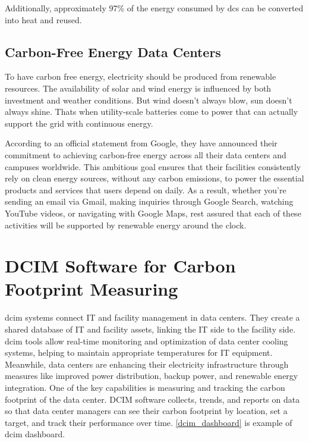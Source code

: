 \documentclass[
  a4paper,  %
  twoside,  %
  bibliography=totoc,
  headsepline,
  cleardoublepage=empty,
  parskip=half,
  draft=false
]{scrbook}
\begin{document}
Additionally, approximately 97\% of the energy consumed by \gls{dc}s can be converted into heat and reused\cite{distributed_head}.

\section{Carbon-Free Energy Data Centers}

To have carbon free energy, electricity should be produced from renewable resources\cite{qazi2019towards}. The availability of solar and wind energy is influenced by both investment and weather conditions. But wind doesn't always blow, sun doesn't always shine. Thats when utility-scale batteries come to power that can actually support the grid with continuous energy.

According to an official statement from Google, they have announced their commitment to achieving carbon-free energy across all their data centers and campuses worldwide. This ambitious goal ensures that their facilities consistently rely on clean energy sources, without any carbon emissions, to power the essential products and services that users depend on daily. As a result, whether you're sending an email via Gmail, making inquiries through Google Search, watching YouTube videos, or navigating with Google Maps, rest assured that each of these activities will be supported by renewable energy around the clock\cite{google2020thirddecade}.


\chapter{DCIM Software for Carbon Footprint Measuring}\label{chap8}
\gls{dcim} systems connect IT and facility management in data centers. They create a shared database of IT and facility assets, linking the IT side to the facility side\cite{salimenergy}. \gls{dcim} tools allow real-time monitoring and optimization of data center cooling systems, helping to maintain appropriate temperatures for IT equipment. Meanwhile, data centers are enhancing their electricity infrastructure through measures like improved power distribution, backup power, and renewable energy integration\cite{murino2023sustainable}. One of the key capabilities is measuring and tracking the carbon footprint of the data center. DCIM software collects, trends, and reports on data so that data center managers can see their carbon footprint by location, set a target, and track their performance over time\cite{sunbirddcimDataCenter}. \ref{dcim_dashboard} is example of \gls{dcim} dashboard.
\end{document}
